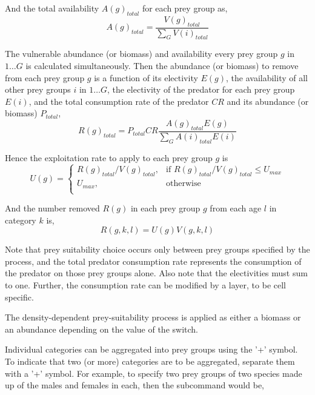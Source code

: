 And the total availability $A(g)_{total}$ for each prey group as,
\begin{equation}
A(g)_{total} = \frac{V(g)_{total}}{\sum\limits_G {V(i)_{total}}}
\end{equation}

The vulnerable abundance (or biomass) and availability every prey group $g$ in $1 \ldots G$ is calculated simultaneously. Then the abundance (or biomass) to remove from each prey group $g$ is a function of its electivity $E(g)$, the availability of all other prey groups $i$ in $1 \ldots G$, the electivity of the predator for each prey group $E(i)$, and the total consumption rate of the predator $CR$ and its abundance (or biomass) $P_{total}$,
\begin{equation}
R(g)_{total}=P_{total} CR \frac{A(g)_{total} E(g)}{\sum\limits_G {A(i)_{total} E(i)}}
\end{equation}

Hence the exploitation rate to apply to each prey group $g$ is
\begin{equation}
U(g) = \begin{cases}
R(g)_{total}/V(g)_{total}, & \text{if $R(g)_{total}/V(g)_{total} \leq U_{max}$} \\
U_{max}, & \text{otherwise}\\
\end{cases}
\end{equation}

And the number removed $R(g)$ in each prey group $g$ from each age $l$ in category $k$ is,
\begin{equation}
R(g,k,l) = U(g)V(g,k,l)
\end{equation}

Note that prey suitability choice occurs only between prey groups specified by the process, and the total predator consumption rate represents the consumption of the predator on those prey groups alone. Also note that the electivities must sum to one. Further, the consumption rate can be modified by a layer, to be cell specific.

The density-dependent prey-suitability process is applied as either a biomass or an abundance depending on the value of the  switch.

Individual categories can be aggregated into prey groups using the '+' symbol. To indicate that two (or more) categories are to be aggregated, separate them with a '+' symbol. For example, to specify two prey groups of two species made up of the males and females in each, then the subcommand would be,

